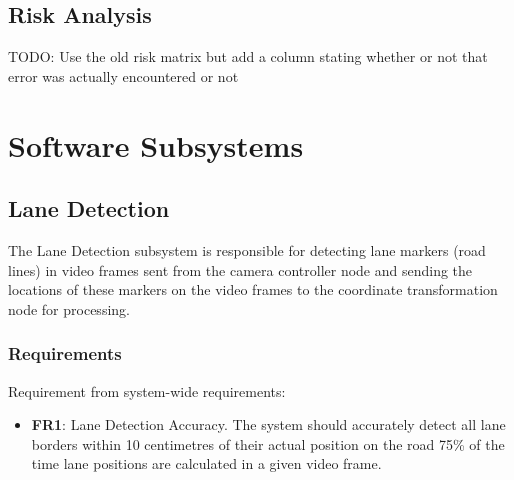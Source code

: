 \documentclass[titlepage]{article}
\begin{document}
\subsection{Risk Analysis}
TODO: Use the old risk matrix but add a column stating whether or not that error was actually encountered or not

\section{Software Subsystems}

\subsection{Lane Detection}

The Lane Detection subsystem is responsible for detecting lane markers (road lines) in video frames sent from the camera
controller node and sending the locations of these markers on the video frames to the coordinate transformation node for
processing.

\subsubsection{Requirements}

Requirement from system-wide requirements:

\begin{itemize}
	\item \textbf{FR1}: Lane Detection Accuracy. The system should accurately detect all lane borders within 10 centimetres
	      of their actual position on the road 75\% of the time lane positions are calculated in a given video frame.
\end{itemize}
\end{document}

